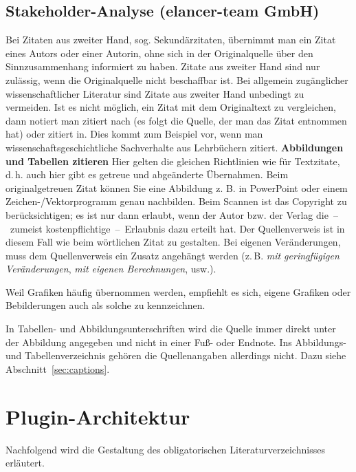 \subsection{Stakeholder-Analyse (elancer-team GmbH)}
Bei Zitaten aus zweiter Hand, sog. Sekundärzitaten, übernimmt man ein Zitat eines Autors oder einer Autorin, ohne sich in der Originalquelle über den Sinnzusammenhang informiert zu haben. Zitate aus zweiter Hand sind nur zulässig, wenn die Originalquelle nicht beschaffbar ist. Bei allgemein zugänglicher wissenschaftlicher Literatur sind Zitate aus zweiter Hand unbedingt zu vermeiden. Ist es nicht möglich, ein Zitat mit dem Originaltext zu vergleichen, dann notiert man zitiert nach (es folgt die Quelle, der man das Zitat entnommen hat) oder zitiert in. Dies kommt zum Beispiel vor, wenn man wissenschaftsgeschichtliche Sachverhalte aus Lehrbüchern zitiert.
%
\textbf{Abbildungen und Tabellen zitieren}
\label{sec:refFigures}
Hier gelten die gleichen Richtlinien wie für Textzitate, d.\,h. auch hier gibt es getreue und abgeänderte Übernahmen. Beim originalgetreuen Zitat können Sie eine Abbildung z. B. in PowerPoint oder einem Zeichen-/Vektorprogramm genau nachbilden. Beim Scannen ist das Copyright zu berücksichtigen; es ist nur dann erlaubt, wenn der Autor bzw. der Verlag die~--~zumeist kostenpflichtige~--~Erlaubnis dazu erteilt hat. Der Quellenverweis ist in diesem Fall wie beim wörtlichen Zitat zu gestalten. Bei eigenen Veränderungen, muss dem Quellenverweis ein Zusatz angehängt werden (z.\,B. \emph{mit geringfügigen Veränderungen}, \emph{mit eigenen Berechnungen}, usw.).
\par
Weil Grafiken häufig übernommen werden, empfiehlt es sich, eigene Grafiken oder Bebilderungen auch als solche zu kennzeichnen.
\par
In Tabellen- und Abbildungsunterschriften wird die Quelle immer direkt unter der Abbildung angegeben und nicht in einer Fuß- oder Endnote. Ins Abbildungs- und Tabellenverzeichnis gehören die Quellenangaben allerdings nicht. Dazu siehe Abschnitt~\ref{sec:captions}.
%
%
\section{Plugin-Architektur}
%
Nachfolgend wird die Gestaltung des obligatorischen Literaturverzeichnisses erläutert.
%
